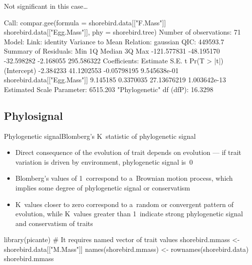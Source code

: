 \documentclass[compress, xelatex, 11pt, xcolor=svgnames, aspectratio=169,
	hyperref={
		bookmarks=true,
		unicode=true,
		colorlinks=true,
		pdftitle={Molecular data in R},
		plainpages=false,
		pdfauthor={Vojtech Zeisek},
		pdfsubject={Course about phylogeny and evolution in R},
		pdfcreator={XeLaTeX},
		pdfkeywords={R, evolution, phylogeny, molecular data},
		linkcolor=Crimson, %
		anchorcolor=Magenta, %
		citecolor=Magenta, %
		filecolor=Magenta, %
		menucolor=Magenta, %
		urlcolor=DodgerBlue, %
		},
	url={hyphens, lowtilde} %
	]{beamer}
\begin{document}
\begin{frame}[fragile]{Not significant in this case\ldots}
	\begin{spluscode}
    Call: compar.gee(formula = shorebird.data[["F.Mass"]] ~
      shorebird.data[["Egg.Mass"]], phy = shorebird.tree)
    Number of observations:  71 
    Model:
                          Link: identity 
     Variance to Mean Relation: gaussian 
    QIC: 449593.7 
    Summary of Residuals:
            Min          1Q      Median          3Q         Max 
    -121.577831  -48.195170  -32.598282   -2.168055  295.586322 
    Coefficients:
                                  Estimate       S.E.           t  Pr(T > |t|)
    (Intercept)                  -2.384233 41.1202553 -0.05798195 9.545638e-01
    shorebird.data[["Egg.Mass"]]  9.145185  0.3370035 27.13676219 1.003642e-13
    Estimated Scale Parameter:  6515.203
    "Phylogenetic" df (dfP):  16.3298 
	\end{spluscode}
\end{frame}

%
%

\subsection{Phylosignal}

\begin{frame}[fragile]{Phylogenetic signal}{Blomberg's K~statistic of phylogenetic signal}
	\begin{itemize}
		\item Direct consequence of the evolution of trait depends on evolution --- if trait variation is driven by environment, phylogenetic signal is~0
		\item Blomberg's values of 1~correspond to a~Brownian motion process, which implies some degree of phylogenetic signal or conservatism
		\item K~values closer to zero correspond to a~random or convergent pattern of evolution, while K~values greater than 1~indicate strong phylogenetic signal and conservatism of traits
	\end{itemize}
	\begin{spluscode}
    library(picante)
    # It requires named vector of trait values
    shorebird.mmass <- shorebird.data[["M.Mass"]]
    names(shorebird.mmass) <- rownames(shorebird.data)
    shorebird.mmass
	\end{spluscode}
\end{frame}
\end{document}

